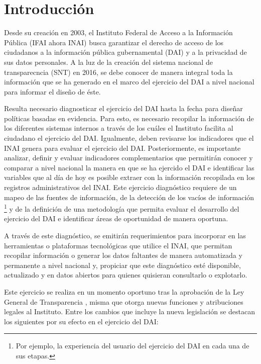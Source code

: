 \chapter{Introducción}

Desde su creación en 2003, el Instituto Federal de Acceso a la Información Pública (IFAI ahora INAI) busca garantizar el derecho de acceso de los ciudadanos a la información pública gubernamental (DAI) y a la privacidad de sus datos personales. A la luz de la creación del sistema nacional de transparecncia (SNT) en 2016, se debe conocer de manera integral toda la información que se ha generado en el marco del ejercicio del DAI a nivel nacional para informar el diseño de éste.

Resulta necesario diagnosticar el ejercicio del DAI hasta la fecha para diseñar políticas basadas en evidencia. Para esto, es necesario recopilar la información de los diferentes sistemas internos a través de los cuáles el Instituto facilita al ciudadano el ejercicio del DAI. Igualmente, deben revisarse los indicadores que el INAI genera para evaluar el ejercicio del DAI. Posteriormente, es importante analizar, definir y evaluar indicadores complementarios que permitirán conocer y comparar a nivel nacional la manera en que se ha ejercido el DAI e identificar las variables que al día de hoy es posible extraer con la información recopilada en los registros administrativos del INAI. Este ejercicio diagnóstico requiere de un mapeo de las fuentes de información, de la detección de los vacíos de información \footnote{Por ejemplo, la experiencia del usuario del ejercicio del DAI en cada una de sus etapas.} y de la definición de una metodología que permita evaluar el desarrollo del ejercicio del DAI e identificar áreas de oportunidad de manera oportuna.

A través de este diagnóstico, se emitirán requerimientos para incorporar en las herramientas o plataformas tecnológicas que utilice el INAI, que permitan recopilar información o generar los datos faltantes de manera automatizada y permanente a nivel nacional y, propiciar que este diagnóstico esté disponible, actualizado y en datos abiertos para quienes quisieran consultarlo o explotarlo.

Este ejercicio se realiza en un momento oportuno tras la aprobación de la Ley General de Transparencia \parencite{lgt}, misma que otorga nuevas funciones y atribuciones legales al Instituto. Entre los cambios que incluye la nueva legislación se destacan los siguientes por su efecto en el ejercicio del DAI:

